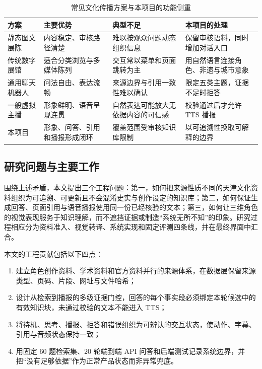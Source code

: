 \documentclass[UTF8,zihao=-4,fontset=none,twoside]{ctexart}
\begin{document}
\begin{table}[htbp]
\centering
\caption{常见文化传播方案与本项目的功能侧重}
\label{tab:solution-comparison}
\small
\begin{tabularx}{\linewidth}{@{}P{28mm}Y Y Y@{}}
\toprule
方案 & 主要优势 & 典型不足 & 本项目的处理 \\
\midrule
静态图文展陈 & 内容稳定、审核路径清楚 & 难以按观众问题动态组织信息 & 保留审核语料，同时增加对话入口 \\
传统数字展馆 & 适合分类浏览与多媒体陈列 & 交互常以菜单和页面跳转为主 & 用自然语言连接角色、非遗与城市意象 \\
通用聊天机器人 & 问法自由、表达流畅 & 来源边界与引用一致性难以确认 & 限定五类主题，证据不足时拒答 \\
一般虚拟主播 & 形象鲜明、语音呈现连贯 & 自然表达可能放大无依据内容的可信感 & 校验通过后才允许 TTS 播报 \\
本项目 & 形象、问答、引用和播报形成闭环 & 覆盖范围受审核知识库限制 & 以可追溯性换取可解释的边界 \\
\bottomrule
\end{tabularx}
\end{table}

\subsection{研究问题与主要工作}

围绕上述矛盾，本文提出三个工程问题：第一，如何把来源性质不同的天津文化资料组织为可追溯、可更新且不会混淆史实与创作设定的知识库；第二，如何保证生成回答、页面引用与语音播报使用同一份已经核验的文本；第三，如何让三维角色的视觉表现服务于知识理解，而不遮挡证据或制造“系统无所不知”的印象。研究过程相应分为资料准入、视觉转译、系统实现和固定评测四条线，并在最终界面中汇合。

本文的工程贡献包括以下四点：
\begin{enumerate}
  \item 建立角色创作资料、学术资料和官方资料并行的来源体系，在数据层保留来源类型、页码、片段、网址与文件哈希；
  \item 设计从检索到播报的多级证据门控，回答的每个事实段必须绑定本轮候选中的有效知识块，未通过校验的文本不能进入 TTS；
  \item 将待机、思考、播报、拒答和错误组织为可辨认的交互状态，使动作、字幕、引用与音频状态保持一致；
  \item 用固定 60 题检索集、20 轮端到端 API 问答和后端测试记录系统边界，并把“没有足够依据”作为正常产品状态而非异常兜底。
\end{enumerate}
\end{document}
